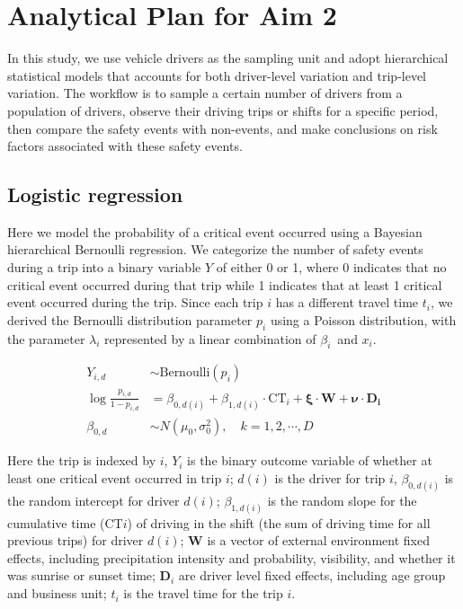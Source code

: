 \documentclass[12pt]{book}
\numberwithin{equation}{chapter}
\begin{document}
\hypertarget{analytical-plan-for-aim-2}{%
\section{Analytical Plan for Aim 2}\label{analytical-plan-for-aim-2}}

In this study, we use vehicle drivers as the sampling unit and adopt hierarchical statistical models that accounts for both driver-level variation and trip-level variation. The workflow is to sample a certain number of drivers from a population of drivers, observe their driving trips or shifts for a specific period, then compare the safety events with non-events, and make conclusions on risk factors associated with these safety events.

\hypertarget{logistic-regression}{%
\subsection{Logistic regression}\label{logistic-regression}}

Here we model the probability of a critical event occurred using a Bayesian hierarchical Bernoulli regression. We categorize the number of safety events during a trip into a binary variable \(Y\) of either 0 or 1, where 0 indicates that no critical event occurred during that trip while 1 indicates that at least 1 critical event occurred during the trip. Since each trip \(i\) has a different travel time \(t_i\), we derived the Bernoulli distribution parameter \(p_i\) using a Poisson distribution, with the parameter \(\lambda_i\) represented by a linear combination of \(\beta_i\)~and \(x_i\).

\[
\begin{split}
Y_{i, d} &\sim \text{Bernoulli}(p_i)\\
\log\frac{p_{i, d}}{1-p_{i, d}} &= \beta_{0, d(i)} + \beta_{1, d(i)} \cdot \text{CT}_i + \mathbf{\xi} \cdot \mathbf{W} + \mathbf{\nu} \cdot \mathbf{D_i}\\
\beta_{0, d} &\sim N(\mu_0, \sigma_0^2), \quad k = 1, 2, \cdots, D
\label{eq:hierarchicallogit}
\end{split}
\]

Here the trip is indexed by \(i\), \(Y_i\) is the binary outcome variable of whether at least one critical event occurred in trip \(i\); \(d(i)\) is the driver for trip \(i\), \(\beta_{0, d(i)}\) is the random intercept for driver \(d(i)\); \(\beta_{1, d(i)}\) is the random slope for the cumulative time (CT\(i\)) of driving in the shift (the sum of driving time for all previous trips) for driver \(d(i)\); \(\mathbf{W}\) is a vector of external environment fixed effects, including precipitation intensity and probability, visibility, and whether it was sunrise or sunset time; \(\mathbf{D}_i\) are driver level fixed effects, including age group and business unit; \(t_i\) is the travel time for the trip \(i\).
\end{document}
